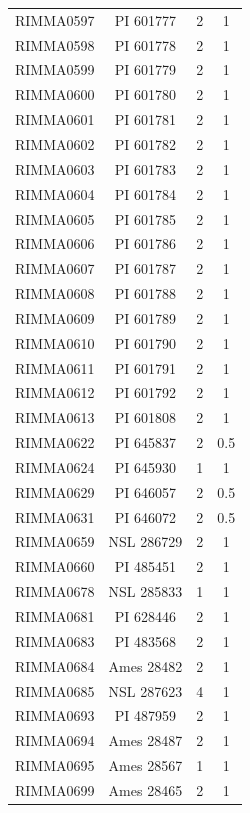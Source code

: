 \documentclass[11pt]{article}
\newcounter{rowno}
\begin{document}
\begin{scriptsize}
\begin{longtable}{>{\stepcounter{rowno}}cccc}
    RIMMA0597 & PI	601777 & 2     & 1 \\
    RIMMA0598 & PI	601778 & 2     & 1 \\
    RIMMA0599 & PI	601779 & 2     & 1 \\
    RIMMA0600 & PI	601780 & 2     & 1 \\
    RIMMA0601 & PI	601781 & 2     & 1 \\
    RIMMA0602 & PI	601782 & 2     & 1 \\
    RIMMA0603 & PI	601783 & 2     & 1 \\
    RIMMA0604 & PI	601784 & 2     & 1 \\
    RIMMA0605 & PI	601785 & 2     & 1 \\
    RIMMA0606 & PI	601786 & 2     & 1 \\
    RIMMA0607 & PI	601787 & 2     & 1 \\
    RIMMA0608 & PI	601788 & 2     & 1 \\
    RIMMA0609 & PI	601789 & 2     & 1 \\
    RIMMA0610 & PI	601790 & 2     & 1 \\
    RIMMA0611 & PI	601791 & 2     & 1 \\
    RIMMA0612 & PI	601792 & 2     & 1 \\
    RIMMA0613 & PI	601808 & 2     & 1 \\
    RIMMA0622 & PI	645837 & 2     & 0.5 \\
    RIMMA0624 & PI	645930 & 1     & 1 \\
    RIMMA0629 & PI	646057 & 2     & 0.5 \\
    RIMMA0631 & PI	646072 & 2     & 0.5 \\
    RIMMA0659 & NSL	286729 & 2     & 1 \\
    RIMMA0660 & PI	485451 & 2     & 1 \\
    RIMMA0678 & NSL	285833 & 1     & 1 \\
    RIMMA0681 & PI	628446 & 2     & 1 \\
    RIMMA0683 & PI	483568 & 2     & 1 \\
    RIMMA0684 & Ames	28482 & 2     & 1 \\
    RIMMA0685 & NSL	287623 & 4     & 1 \\
    RIMMA0693 & PI	487959 & 2     & 1 \\
    RIMMA0694 & Ames	28487 & 2     & 1 \\
    RIMMA0695 & Ames	28567 & 1     & 1 \\
    RIMMA0699 & Ames	28465 & 2     & 1 \\

\end{longtable}
\end{scriptsize}
\end{document}
